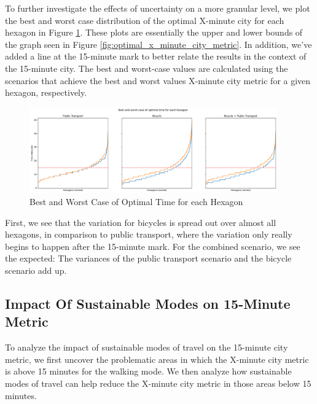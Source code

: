 To further investigate the effects of uncertainty on a more granular level, we plot the best and worst case distribution of the optimal X-minute city for each hexagon in Figure \ref{fig:best_and_worst_case_of_optimal_time_for_each_hexagon}.
These plots are essentially the upper and lower bounds of the graph seen in Figure \ref{fig:optimal_x_minute_city_metric}.
In addition, we've added a line at the 15-minute mark to better relate the results in the context of the 15-minute city.
The best and worst-case values are calculated using the scenarios that achieve the best and worst values X-minute city metric for a given hexagon, respectively.
\begin{figure}
  \begin{center}
    \includegraphics[width=0.95\textwidth]{Figures/results/uncertainty/optimal_best_worst_case}
  \end{center}
  \caption{Best and Worst Case of Optimal Time for each Hexagon}
  \label{fig:best_and_worst_case_of_optimal_time_for_each_hexagon}
\end{figure}
First, we see that the variation for bicycles is spread out over almost all hexagons, in comparison to public transport, where the variation only really begins to happen after the 15-minute mark.
For the combined scenario, we see the expected: The variances of the public transport scenario and the bicycle scenario add up.

\subsection{Impact Of Sustainable Modes on 15-Minute Metric}
\label{subsec:impact_of_sustainable_modes_on_15_minute_metric}

To analyze the impact of sustainable modes of travel on the 15-minute city metric, we first uncover the problematic areas in which the X-minute city metric is above 15 minutes for the walking mode.
We then analyze how sustainable modes of travel can help reduce the X-minute city metric in those areas below 15 minutes.

